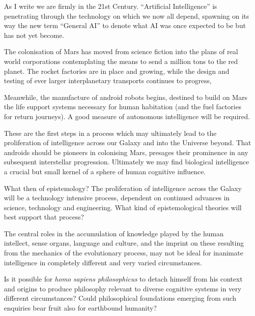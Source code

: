 \documentclass[10pt,titlepage]{book}
\begin{document}
As I write we are firmly in the 21st Century.
``Artificial Intelligence'' is penetrating through the technology on which we now all depend, spawning on its way the new term ``General AI'' to denote what AI was once expected to be but has not yet become.

The colonisation of Mars has moved from science fiction into the plans of real world corporations contemplating the means to send a million tons to the red planet.
The rocket factories are in place and growing, while the design and testing of ever larger interplanetary transports continues to progress,

Meanwhile, the manufacture of android robots begins, destined to build on Mars the life support systems necessary for human habitation (and the fuel factories for return journeys).
A good measure of autonomous intelligence will be required.

These are the first steps in a process which may ultimately lead to the proliferation of intelligence across our Galaxy and into the Universe beyond.
That androids should be pioneers in colonising Mars, presages their prominence in any subsequent interstellar progression.
Ultimately we may find biological intelligence a crucial but small kernel of a sphere of human cognitive influence.

What then of epistemology?
The proliferation of intelligence across the Galaxy will be a technology intensive process, dependent on continued advances in science, technology and engineering.
What kind of epistemological theories will best support that process?

The central roles in the accumulation of knowledge played by the human intellect, sense organs, language and culture, and the imprint on these resulting from the mechanics of the evolutionary process, may not be ideal for inanimate intelligence in completely different and very varied circumstances.

Is it possible for \emph{homo sapiens philosophicus} to detach himself from his context and origins to produce philosophy relevant to diverse cognitive systems in very different circumstances?
Could philosophical foundations emerging from such enquiries bear fruit also for earthbound humanity?
\end{document}
